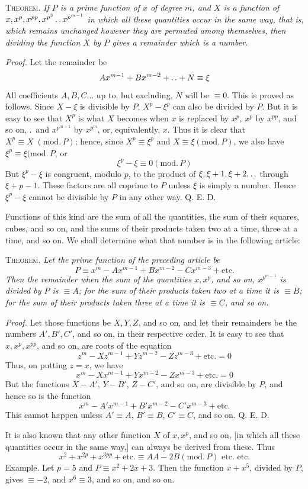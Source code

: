\textsc{Theorem.} \emph{If $P$ is a prime function of $x$ of degree $m$, and $X$ is a function of $x,x^p,x^{pp},x^{p^3}\mathinner{.\,.} x^{p^{m-1}}$ in which all these quantities occur in the same way, that is, which remains unchanged however they are permuted among themselves, then dividing the function $X$ by $P$ gives a remainder which is a number.}

\emph{Proof.} Let the remainder be
\[
Ax^{m-1}+Bx^{m-2}+\mathinner{.\,.}+N\equiv\xi
\]
All coefficients $A,B,C\ldots$ up to, but excluding, $N$ will be $\equiv0$. This is proved as follows. Since $X-\xi$ is divisible by $P$, $X^p-\xi^p$ can also be divided by $P$.
But it is easy to see that $X^p$ is what $X$ becomes when $x$ is replaced by $x^p$, $x^p$ by $x^{pp}$, and so on, .\ and $x^{p^{m-1}}$ by $x^{p^m}$, or, equivalently, $x$. Thus it is clear that $X^p\equiv X\;(\mathrm{mod.}\,P)$; hence, since $X^p\equiv\xi^p$ and $X\equiv\xi(\mathrm{mod.}\,P)$, we also have $\xi^p\equiv\xi(\mathrm{mod.}\,P$, or
\[
\xi^p-\xi\equiv0(\mathrm{mod.}\,P)
\]
But $\xi^p-\xi$ is congruent, modulo $p$, to the product of $\xi,\xi+1,\xi+2,\mathinner{.\,.}$ through $\xi+p-1$. These factors are all coprime to $P$ unless $\xi$ is simply a number. Hence $\xi^p-\xi$ cannot be divisible by $P$ in any other way. Q. E. D.

Functions of this kind are the sum of all the quantities, the sum of their squares, cubes, and so on, and the sums of their products taken two at a time, three at a time, and so on. We shall determine what that number is in the following article:

\clearpage
{}
\textsc{Theorem.} \emph{Let the prime function of the preceding article be}
\[
P\equiv x^m-Ax^{m-1}+Bx^{m-2}-Cx^{m-3}+\text{etc.}
\]
\emph{Then the remainder when the sum of the quantities $x,x^p$, and so on, $x^{p^{m-1}}$ is divided by $P$ is $\equiv A$; for the sum of their products taken two at a time it is $\equiv B$; for the sum of their products taken three at a time it is $\equiv C$, and so on.}

\emph{Proof.} Let those functions be $X,Y,Z$, and so on, and let their remainders be the numbers $A',B',C'$, and so on, in their respective order. It is easy to see that $x,x^p,x^{pp}$, and so on, are roots of the equation
\[
z^m-Xz^{m-1}+Yz^{m-2}-Zz^{m-3}+\text{etc.}=0
\]
Thus, on putting $z=x$, we have
\[
x^m-Xx^{m-1}+Yx^{m-2}-Zx^{m-3}+\text{etc.}=0
\]
But the functions $X-A'$, $Y-B'$, $Z-C'$, and so on, are divisible by $P$, and hence so is the function
\[
x^m-A'x^{m-1}+B'x^{m-2}-C'x^{m-3}+\text{etc.}
\]
This cannot happen unless $A'\equiv A$, $B'\equiv B$, $C'\equiv C$, and so on. Q. E. D.

It is also known that any other function $X$ of $x,x^p$, and so on, [in which all these quantities occur in the same way,] can always be derived from these. Thus
\[
x^2+x^{2p}+x^{3pp}+\text{etc.}\equiv AA-2B(\mathrm{mod.}\,P)\text{ etc. etc.}
\]
Example. Let $p=5$ and $P\equiv x^2+2x+3$. Then the function $x+x^5$, divided by $P$, gives $\equiv-2$, and $x^6\equiv3$, and so on, and so on.
